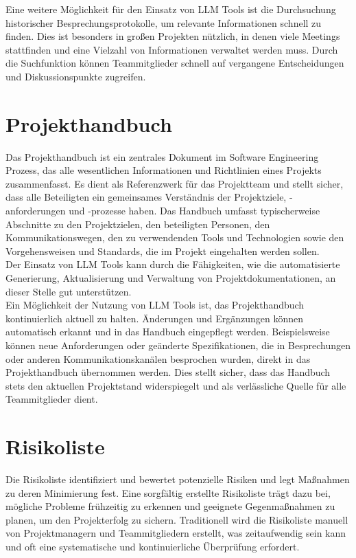 Eine weitere Möglichkeit für den Einsatz von LLM Tools ist die Durchsuchung historischer Besprechungsprotokolle, um relevante 
Informationen schnell zu finden. Dies ist besonders in großen Projekten nützlich, in denen viele Meetings stattfinden und eine
Vielzahl von Informationen verwaltet werden muss. Durch die Suchfunktion können Teammitglieder schnell auf vergangene 
Entscheidungen und Diskussionspunkte zugreifen.

\section{Projekthandbuch}  \label{Projekthandbuch}

Das Projekthandbuch ist ein zentrales Dokument im Software Engineering Prozess, das alle wesentlichen Informationen und 
Richtlinien eines Projekts zusammenfasst. Es dient als Referenzwerk für das Projektteam und stellt sicher, dass alle 
Beteiligten ein gemeinsames Verständnis der Projektziele, -anforderungen und -prozesse haben. Das Handbuch umfasst 
typischerweise Abschnitte zu den Projektzielen, den beteiligten Personen, den Kommunikationswegen, den zu verwendenden 
Tools und Technologien sowie den Vorgehensweisen und Standards, die im Projekt eingehalten werden sollen.\\

Der Einsatz von LLM Tools kann durch die Fähigkeiten, wie die automatisierte Generierung, Aktualisierung 
und Verwaltung von Projektdokumentationen, an dieser Stelle gut unterstützen.\\

Ein Möglichkeit der Nutzung von LLM Tools ist, das Projekthandbuch kontinuierlich aktuell zu 
halten. Änderungen und Ergänzungen können automatisch erkannt und in das Handbuch eingepflegt werden. Beispielsweise 
können neue Anforderungen oder geänderte Spezifikationen, die in Besprechungen oder anderen Kommunikationskanälen 
besprochen wurden, direkt in das Projekthandbuch übernommen werden. Dies stellt sicher, dass das Handbuch stets den 
aktuellen Projektstand widerspiegelt und als verlässliche Quelle für alle Teammitglieder dient.

\section{Risikoliste}  \label{Risikoliste}

Die Risikoliste identifiziert und bewertet potenzielle Risiken und legt Maßnahmen zu deren Minimierung fest.
Eine sorgfältig erstellte Risikoliste trägt dazu bei, mögliche Probleme frühzeitig zu erkennen und geeignete 
Gegenmaßnahmen zu planen, um den Projekterfolg zu sichern. Traditionell wird die Risikoliste manuell von 
Projektmanagern und Teammitgliedern erstellt, was zeitaufwendig sein kann und oft eine systematische und 
kontinuierliche Überprüfung erfordert.\\


